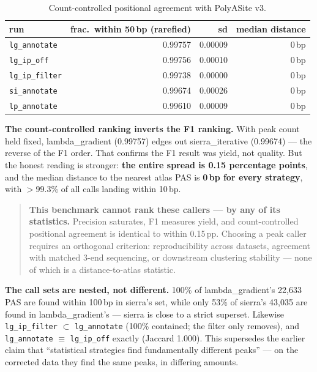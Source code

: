 \documentclass[11pt,a4paper]{article}
\begin{document}
\begin{table}[htbp]
  \centering
  \small
  \begin{tabular}{lrrr}
    \toprule
    run & frac.\ within 50\,bp (rarefied) & sd & median distance \\
    \midrule
    \texttt{lg\_annotate}   & 0.99757 & 0.00009 & 0\,bp \\
    \texttt{lg\_ip\_off}    & 0.99756 & 0.00010 & 0\,bp \\
    \texttt{lg\_ip\_filter} & 0.99738 & 0.00000 & 0\,bp \\
    \texttt{si\_annotate}   & 0.99674 & 0.00026 & 0\,bp \\
    \texttt{lp\_annotate}   & 0.99610 & 0.00009 & 0\,bp \\
    \bottomrule
  \end{tabular}
  \caption{Count-controlled positional agreement with PolyASite v3.}
  \label{tab:rarefaction}
\end{table}

\textbf{The count-controlled ranking inverts the F1 ranking.} With peak count held
fixed, lambda\_gradient (0.99757) edges out sierra\_iterative (0.99674) --- the
reverse of the F1 order. That confirms the F1 result was yield, not quality. But
the honest reading is stronger: \textbf{the entire spread is 0.15 percentage
points}, and the median distance to the nearest atlas PAS is \textbf{0\,bp for
every strategy}, with $>$99.3\% of all calls landing within 10\,bp.

\begin{quote}
\textbf{This benchmark cannot rank these callers --- by any of its statistics.}
Precision saturates, F1 measures yield, and count-controlled positional agreement
is identical to within 0.15\,pp. Choosing a peak caller requires an orthogonal
criterion: reproducibility across datasets, agreement with matched
3\textquotesingle{}-end sequencing, or downstream clustering stability --- none of
which is a distance-to-atlas statistic.
\end{quote}

\textbf{The call sets are nested, not different.} 100\% of lambda\_gradient's
22,633 PAS are found within 100\,bp in sierra's set, while only 53\% of sierra's
43,035 are found in lambda\_gradient's --- sierra is close to a strict superset.
Likewise \texttt{lg\_ip\_filter} $\subset$ \texttt{lg\_annotate} (100\% contained;
the filter only removes), and \texttt{lg\_annotate} $\equiv$ \texttt{lg\_ip\_off}
exactly (Jaccard 1.000). This supersedes the earlier claim that ``statistical
strategies find fundamentally different peaks'' --- on the corrected data they find
the same peaks, in differing amounts.
\end{document}
